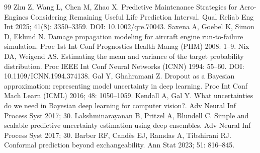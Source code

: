 \begin{thebibliography}{99}
 Zhu Z, Wang L, Chen M, Zhao X. Predictive Maintenance Strategies for Aero‐Engines Considering Remaining Useful Life Prediction Interval. Qual Reliab Eng Int 2025; 41(8): 3350–3359. DOI: 10.1002/qre.70043.
 Saxena A, Goebel K, Simon D, Eklund N. Damage propagation modeling for aircraft engine run-to-failure simulation. Proc 1st Int Conf Prognostics Health Manag (PHM) 2008: 1–9.
 Nix DA, Weigend AS. Estimating the mean and variance of the target probability distribution. Proc IEEE Int Conf Neural Networks (ICNN) 1994: 55–60. DOI: 10.1109/ICNN.1994.374138.
 Gal Y, Ghahramani Z. Dropout as a Bayesian approximation: representing model uncertainty in deep learning. Proc Int Conf Mach Learn (ICML) 2016; 48: 1050–1059.
 Kendall A, Gal Y. What uncertainties do we need in Bayesian deep learning for computer vision?. Adv Neural Inf Process Syst 2017; 30.
 Lakshminarayanan B, Pritzel A, Blundell C. Simple and scalable predictive uncertainty estimation using deep ensembles. Adv Neural Inf Process Syst 2017; 30.
 Barber RF, Candès EJ, Ramdas A, Tibshirani RJ. Conformal prediction beyond exchangeability. Ann Stat 2023; 51: 816–845.
\end{thebibliography}
